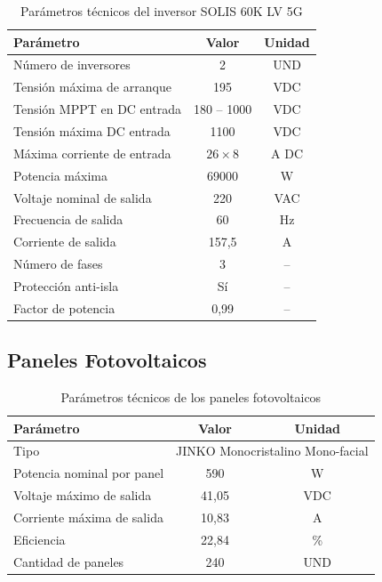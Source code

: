 \begin{table}[H]
    \centering
    \caption{Parámetros técnicos del inversor SOLIS 60K LV 5G}
    \begin{tabular}{lcc}
    \toprule
    \textbf{Parámetro} & \textbf{Valor} & \textbf{Unidad} \\
    \midrule
    Número de inversores & 2 & UND \\
    Tensión máxima de arranque & 195 & VDC \\
    Tensión MPPT en DC entrada & 180 -- 1000 & VDC \\
    Tensión máxima DC entrada & 1100 & VDC \\
    Máxima corriente de entrada & $26 \times 8$ & A DC \\
    Potencia máxima & 69000 & W \\
    Voltaje nominal de salida & 220 & VAC \\
    Frecuencia de salida & 60 & Hz \\
    Corriente de salida & 157,5 & A \\
    Número de fases & 3 & -- \\
    Protección anti-isla & Sí & -- \\
    Factor de potencia & 0,99 & -- \\
    \bottomrule
    \end{tabular}
\end{table}

\subsection{Paneles Fotovoltaicos}

\begin{table}[H]
    \centering
    \caption{Parámetros técnicos de los paneles fotovoltaicos}
    \begin{tabular}{lcc}
    \toprule
    \textbf{Parámetro} & \textbf{Valor} & \textbf{Unidad} \\
    \midrule
    Tipo & \multicolumn{2}{l}{JINKO Monocristalino Mono-facial} \\
    Potencia nominal por panel & 590 & W \\
    Voltaje máximo de salida & 41,05 & VDC \\
    Corriente máxima de salida & 10,83 & A \\
    Eficiencia & 22,84 & \% \\
    Cantidad de paneles & 240 & UND \\
    \bottomrule
    \end{tabular}
\end{table}


